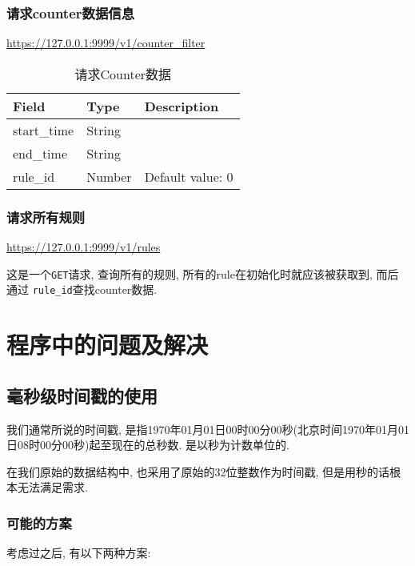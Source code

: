 \subsection{请求counter数据信息}

\url{https://127.0.0.1:9999/v1/counter_filter}

\begin{table}[]
    \centering
    \caption{请求Counter数据}
    \label{tbl:get_counter}
    \begin{tabular}{lll}
    Field       & Type   & Description      \\ \hline
    start\_time & String &                  \\
    end\_time   & String &                  \\
    rule\_id    & Number & Default value: 0 \\ \hline
    \end{tabular}
\end{table}

\subsection{请求所有规则}

\url{https://127.0.0.1:9999/v1/rules}

这是一个\texttt{GET}请求, 查询所有的规则, 所有的rule在初始化时就应该被获取到,
而后通过 \texttt{rule\_id}查找counter数据.


\chapter{程序中的问题及解决}\label{chap:程序中的问题及解决}

\section{毫秒级时间戳的使用}

我们通常所说的时间戳,
是指1970年01月01日00时00分00秒(北京时间1970年01月01日08时00分00秒)起至现在的总秒数.
是以秒为计数单位的.

在我们原始的数据结构中, 也采用了原始的32位整数作为时间戳,
但是用秒的话根本无法满足需求.

\subsection{可能的方案}

考虑过之后, 有以下两种方案:

